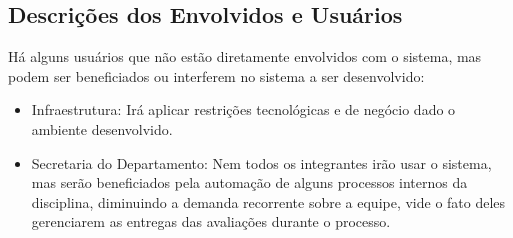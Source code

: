 \begin{table}[!htb]
    \centering
    \caption{Sentença básica de posição do produto}
    \label{sentenca-posicao}
\end{table}


\subsection{Descrições dos Envolvidos e Usuários}
Há alguns usuários que não estão diretamente envolvidos com o sistema, mas podem ser beneficiados ou interferem no sistema a ser desenvolvido:

\begin{itemize}
    \item Infraestrutura: Irá aplicar restrições tecnológicas e de negócio dado o ambiente desenvolvido.
    \item Secretaria do Departamento: Nem todos os integrantes irão usar o sistema, mas serão beneficiados pela automação de alguns processos internos da disciplina, diminuindo a demanda recorrente sobre a equipe, vide o fato deles gerenciarem as entregas das avaliações durante o processo.
\end{itemize}

